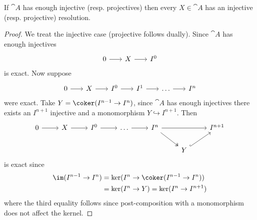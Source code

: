 \documentclass[../main.tex]{subfiles}
\begin{document}
\begin{lem}
    If $\cat A$ has enough injective (resp. projectives) then every $X\in \cat A$ has an injective (resp. projective) resolution.
\end{lem}
\begin{proof}
    We treat the injective case (projective follows dually). Since $\cat A$ has enough injectives
    \[\begin{tikzcd}[column sep=scriptsize]
        0\ar[r] & X \ar[r] & I^0
    \end{tikzcd}\]
    is exact. Now suppose
    \[\begin{tikzcd}[column sep=scriptsize]
        0 \ar[r] & X \ar[r] & I^0 \ar[r] & I^1 \ar[r] & \dots \ar[r] & I^n
    \end{tikzcd}\]
    were exact. Take $Y = \coker(I^{n-1} \to I^n)$, since $\cat A$ has enough injectives there exists an $I^{n+1}$ injective and a monomorphism $Y\hookrightarrow I^{n+1}$. Then
\[\begin{tikzcd}
	0 & X & {I^0} & \dots & {I^n} && {I^{n+1}} \\
	&&&&& Y
	\arrow[from=1-1, to=1-2]
	\arrow[from=1-2, to=1-3]
	\arrow[from=1-3, to=1-4]
	\arrow[from=1-4, to=1-5]
	\arrow[from=1-5, to=1-7]
	\arrow[two heads, from=1-5, to=2-6]
	\arrow[hook, from=2-6, to=1-7]
\end{tikzcd}\]
is exact since
\begin{align*}
    \im(I^{n-1} \to I^n) &= \ker(I^n \to \coker(I^{n-1} \to I^n)) \\
    &= \ker(I^n \to Y) = \ker(I^n \to I^{n+1})
\end{align*}
where the third equality follows since post-composition with a monomorphism does not affect the kernel.
\end{proof}
\end{document}
